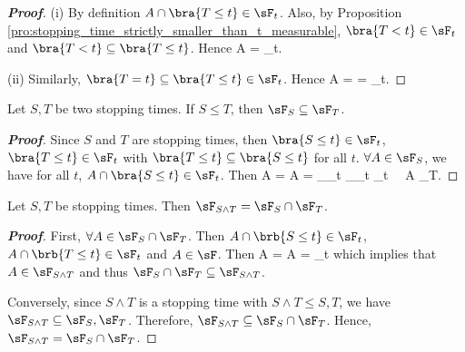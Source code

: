 \begin{proof}[\bf Proof]
\ben
\item [(i)] By definition $A\cap \bra{T\leq t} \in \sF_t$. Also, by Proposition \ref{pro:stopping_time_strictly_smaller_than_t_measurable}, $\bra{T<t}\in \sF_t$ and $\bra{T<t}\subseteq \bra{T\leq t}$. Hence
\be
A\cap {} = \cap {} \in \sF_t.
\ee

\item [(ii)] Similarly, $\bra{T=t} \subseteq \bra{T\leq t} \in \sF_t$. Hence
\be
A\cap {} =  \cap {} =  \cap {} \in \sF_t.
\ee
\een
\end{proof}

\begin{proposition}\label{pro:sigma_algebra_stopping_times_continuous_increasing}
Let $S,T$ be two stopping times. If $S\leq T$, then $\sF_S \subseteq \sF_T$.
\end{proposition}

\begin{proof}[\bf Proof]
Since $S$ and $T$ are stopping times, then $\bra{S \leq t}\in \sF_t$, $\bra{T \leq t}\in \sF_t$ with $\bra{T\leq t} \subseteq \bra{S\leq t}$ for all $t$. $\forall A \in \sF_S$, we have for all $t$, $A \cap \bra{S \leq t} \in \sF_t$. Then
\be
A \cap {} = A \cap {} = _{\in \sF_t} \cap {}_{\in \sF_t} \in \sF_t \ \ra \ A \in \sF_T.
\ee
\end{proof}


\begin{proposition}
Let $S,T$ be stopping times. Then $\sF_{S\land T} = \sF_S\cap \sF_T$.
\end{proposition}

\begin{proof}[\bf Proof]
First, $\forall A\in \sF_S\cap \sF_T$. Then $A\cap \brb{S\leq t}\in\sF_t$, $A\cap \brb{T\leq t}\in\sF_t$ and $A\in \sF$. Then
\be
A\cap {} = A\cap {} =   \cup {} \in \sF_t
\ee
which implies that $A\in \sF_{S\land T}$ and thus $\sF_S\cap \sF_T \subseteq \sF_{S\land T}$.

Conversely, since $S\land T$ is a stopping time with $S\land T\leq S,T$, we have $\sF_{S\land T} \subseteq \sF_S,\sF_T$. Therefore, $\sF_{S\land T}\subseteq \sF_S \cap \sF_T$. Hence, $\sF_{S\land T} = \sF_S \cap \sF_T$.
\end{proof}




